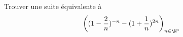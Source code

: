 Trouver une suite \'equivalente \`a
\[\left((1-\dfrac{2}{n})^{-n}-(1+\dfrac{1}{n})^{2n} \right)_{n\in\N^*}\]
\bigskip